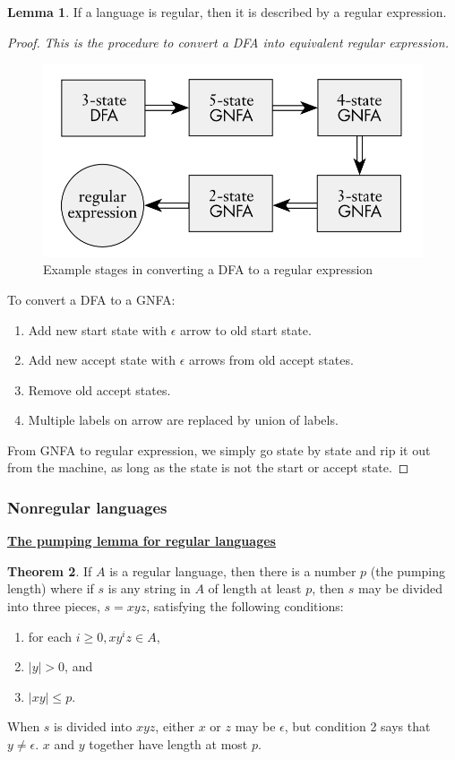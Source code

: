 \documentclass[11pt]{article}
\theoremstyle{definition}
\newtheorem{thm}{Theorem}[section]
\newtheorem{lemma}[thm]{Lemma}
\begin{document}
\begin{lemma}
If a language is regular, then it is described by a regular expression.
\end{lemma}
\begin{proof}
    \textit{This is the procedure to convert a DFA into equivalent regular expression.}\\
    \begin{figure}[H]
	\centering
	\includegraphics[width=0.4\linewidth]{GNFA.png}
	\caption{Example stages in converting a DFA to a regular expression}
	\label{fig}
    \end{figure}
    To convert a DFA to a GNFA:
    \begin{enumerate}
        \item Add new start state with $\epsilon$ arrow to old start state.
        \item Add new accept state with $\epsilon$ arrows from old accept states.
        \item Remove old accept states.
        \item Multiple labels on arrow are replaced by union of labels.
    \end{enumerate}
    From GNFA to regular expression, we simply go state by state and rip it out from the machine, as long as the state is not the start or accept state.
\end{proof}

\subsubsection{Nonregular languages}
\textbf{\underline{The pumping lemma for regular languages}}
\begin{thm}
    If $A$ is a regular language, then there is a number $p$ (the pumping length) where if $s$ is any string in $A$ of length at least $p$, then $s$ may be divided into three pieces, $s = xyz$, satisfying the following conditions:
    \begin{enumerate}
        \item for each $i\geq 0, xy^iz\in A$,
        \item $|y|>0$, and
        \item $|xy| \leq p$.
    \end{enumerate}
When $s$ is divided into $xyz$, either $x$ or $z$ may be $\epsilon$, but condition 2 says that $y \neq \epsilon$. $x$ and $y$ together have length at most $p$.
\end{thm}
\end{document}
